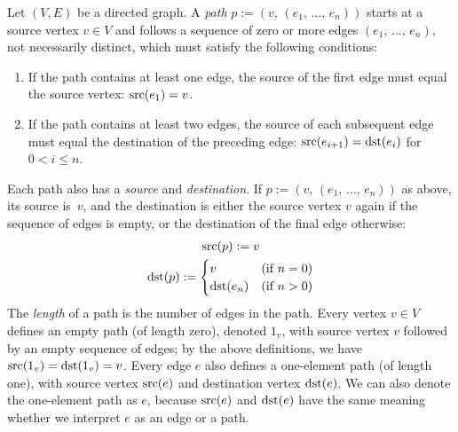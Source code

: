 \documentclass[../generics]{subfiles}
\begin{document}
\begin{definition}\label{digraph path}
Let $(V,E)$ be a directed graph. A \emph{path} $p := (v,\,(e_1,\,\ldots,\,e_n))$ starts at a source vertex $v\in V$ and follows a sequence of zero or more edges $(e_1,\,\ldots,\,e_n)$, not necessarily distinct, which must satisfy the following conditions:
\begin{enumerate}
\item If the path contains at least one edge, the source of the first edge must equal the source vertex: $\operatorname{src}(e_1)=v$.
\item If the path contains at least two edges, the source of each subsequent edge must equal the destination of the preceding edge: $\operatorname{src}(e_{i+1})=\operatorname{dst}(e_i)$ for $0<i\leq n$.
\end{enumerate}
Each path also has a \emph{source} and \emph{destination}. If $p := (v,\,(e_1,\,\ldots,\,e_n))$ as above, its source is~$v$, and the destination is either the source vertex $v$ again if the sequence of edges is empty, or the destination of the final edge otherwise:
\begin{gather*}
\operatorname{src}(p) := v\\
\operatorname{dst}(p) := \begin{cases}
v&\text{(if $n=0$)}\\
\operatorname{dst}(e_n)&\text{(if $n>0$)}
\end{cases}
\end{gather*}
The \emph{length} of a path is the number of edges in the path. Every vertex $v\in V$ defines an empty path (of length zero), denoted $1_v$, with source vertex $v$ followed by an empty sequence of edges; by the above definitions, we have $\operatorname{src}(1_v)=\operatorname{dst}(1_v)=v$. Every edge $e$ also defines a one-element path (of length one), with source vertex $\operatorname{src}(e)$ and destination vertex $\operatorname{dst}(e)$. We can also denote the one-element path as $e$, because $\operatorname{src}(e)$ and $\operatorname{dst}(e)$ have the same meaning whether we interpret $e$ as an edge or a path.
\end{definition}
\end{document}
